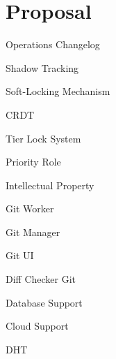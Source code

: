 

\chapter{Proposal}
\label{cha:proposal}

Operations Changelog

Shadow Tracking

Soft-Locking Mechanism

CRDT

Tier Lock System

Priority Role

Intellectual Property

Git Worker

Git Manager

Git UI

Diff Checker Git

Database Support

Cloud Support

DHT